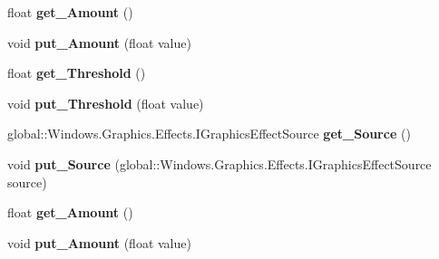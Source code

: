 \begin{DoxyCompactItemize}
float {\bfseries get\+\_\+\+Amount} ()
\item 
\mbox{\label{interface_microsoft_1_1_graphics_1_1_canvas_1_1_effects_1_1_i_sharpen_effect_a3bb5e7555e2d740ab9cff31346d7c9d0}} 
void {\bfseries put\+\_\+\+Amount} (float value)
\item 
\mbox{\label{interface_microsoft_1_1_graphics_1_1_canvas_1_1_effects_1_1_i_sharpen_effect_a0bdc7c0a125711a93f0dd7328f8ca6a0}} 
float {\bfseries get\+\_\+\+Threshold} ()
\item 
\mbox{\label{interface_microsoft_1_1_graphics_1_1_canvas_1_1_effects_1_1_i_sharpen_effect_ab405cc7627dfb79867beeddb90d99055}} 
void {\bfseries put\+\_\+\+Threshold} (float value)
\item 
\mbox{\label{interface_microsoft_1_1_graphics_1_1_canvas_1_1_effects_1_1_i_sharpen_effect_a93ca76a1c96c847cbdeef3cc82a68ac6}} 
global\+::\+Windows.\+Graphics.\+Effects.\+I\+Graphics\+Effect\+Source {\bfseries get\+\_\+\+Source} ()
\item 
\mbox{\label{interface_microsoft_1_1_graphics_1_1_canvas_1_1_effects_1_1_i_sharpen_effect_a88842ec0c36e706f81b03ed1a74748d2}} 
void {\bfseries put\+\_\+\+Source} (global\+::\+Windows.\+Graphics.\+Effects.\+I\+Graphics\+Effect\+Source source)
\item 
\mbox{\label{interface_microsoft_1_1_graphics_1_1_canvas_1_1_effects_1_1_i_sharpen_effect_a2643bf30d314aa459a4d7474614c50f2}} 
float {\bfseries get\+\_\+\+Amount} ()
\item 
\mbox{\label{interface_microsoft_1_1_graphics_1_1_canvas_1_1_effects_1_1_i_sharpen_effect_a3bb5e7555e2d740ab9cff31346d7c9d0}} 
void {\bfseries put\+\_\+\+Amount} (float value)
\item 

\end{DoxyCompactItemize}
